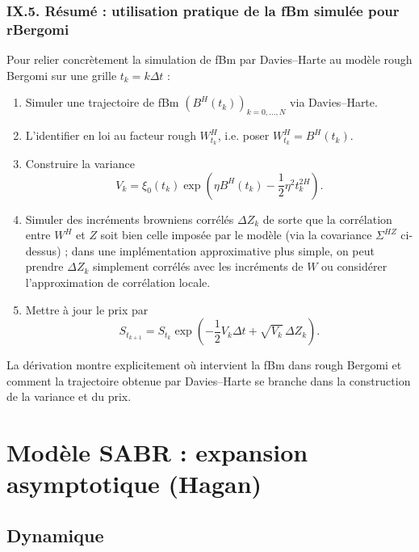 \documentclass[11pt,a4paper]{article}
\newcommand{\1}{\mathbf{1}}
\newcommand{\bH}{B^{H}}
\begin{document}
\subsubsection*{IX.5. Résumé : utilisation pratique de la fBm simulée pour rBergomi}

Pour relier concrètement la simulation de fBm par Davies--Harte au
modèle rough Bergomi sur une grille $t_k=k\Delta t$ :

\begin{enumerate}
  \item Simuler une trajectoire de fBm $(\bH(t_k))_{k=0,\dots,N}$ via
        Davies--Harte.
  \item L'identifier en loi au facteur rough
        $W_{t_k}^H$, i.e. poser $W_{t_k}^H=\bH(t_k)$.
  \item Construire la variance
        \[
          V_k = \xi_0(t_k)
                \exp\!\left(
                  \eta \bH(t_k) - \frac12 \eta^2 t_k^{2H}
                \right).
        \]
  \item Simuler des incréments browniens corrélés $\Delta Z_k$ de sorte
        que la corrélation entre $W^H$ et $Z$ soit bien celle imposée
        par le modèle (via la covariance $\Sigma^{HZ}$ ci-dessus) ;
        dans une implémentation approximative plus simple, on peut
        prendre $\Delta Z_k$ simplement corrélés avec les incréments
        de $W$ ou considérer l'approximation de corrélation locale.
  \item Mettre à jour le prix par
        \[
          S_{t_{k+1}}
          = S_{t_k}
            \exp\!\left(
              -\frac12 V_k \Delta t
              + \sqrt{V_k}\,\Delta Z_k
            \right).
        \]
\end{enumerate}

La dérivation montre explicitement où intervient la fBm dans
rough Bergomi et comment la trajectoire obtenue par Davies--Harte
se branche dans la construction de la variance et du prix.



\section{Mod\`ele SABR : expansion asymptotique (Hagan)}
\label{sec:deriv-sabr}

\subsection*{Dynamique}
\end{document}
